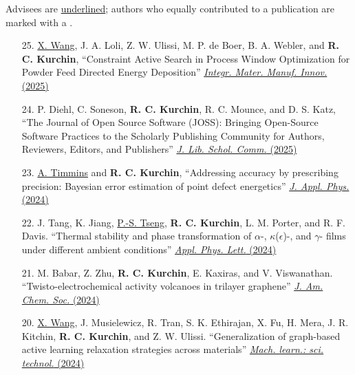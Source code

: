 Advisees are \uline{underlined}; authors who equally contributed to a publication are marked with a \textdagger.

\newcommand{\myname}{\textbf{R. C. Kurchin}}

\begin{enumerate}
        \item[25.] \uline{X. Wang}, J. A. Loli, Z. W. Ulissi, M. P. de Boer, B. A. Webler, and \myname, ``Constraint Active Search in Process Window Optimization for Powder Feed Directed Energy Deposition'' \href{https://doi.org/10.1007/s40192-025-00393-7}{\textit{Integr. Mater. Manuf. Innov.} (2025)}
        
        \item[24.] P. Diehl, C. Soneson, \myname, R. C. Mounce, and D. S. Katz, ``The Journal of Open Source Software (JOSS): Bringing Open-Source Software Practices to the Scholarly Publishing Community for Authors, Reviewers, Editors, and Publishers'' \href{https://doi.org/10.31274/jlsc.18285}{\textit{J. Lib. Schol. Comm.} (2025)}

        \item[23.] \uline{A. Timmins} and \myname, ``Addressing accuracy by prescribing precision: Bayesian error estimation of point defect energetics'' \href{https://doi.org/10.1063/5.0211543}{\textit{J. Appl. Phys.} (2024)}

        \item[22.] J. Tang, K. Jiang, \uline{P.-S. Tseng}, \myname, L. M. Porter, and R. F. Davis. ``Thermal stability and phase transformation of $\alpha$-, $\kappa$($\epsilon$)-, and $\gamma$- films under different ambient conditions'' \href{https://doi.org/10.1063/5.0214500}{\textit{Appl. Phys. Lett.} (2024)}

        \item[21.] M. Babar, Z. Zhu, \myname, E. Kaxiras, and V. Viswanathan. ``Twisto-electrochemical activity volcanoes in trilayer graphene'' \href{https://pubs.acs.org/doi/full/10.1021/jacs.4c03464}{\textit{J. Am. Chem. Soc.} (2024)}

        \item[20.] \uline{X. Wang}, J. Musielewicz, R. Tran, S. K. Ethirajan, X. Fu, H. Mera, J. R. Kitchin, \myname, and Z. W. Ulissi. ``Generalization of graph-based active learning relaxation strategies across materials'' \href{https://iopscience.iop.org/article/10.1088/2632-2153/ad37f0}{\textit{Mach. learn.: sci. technol.} (2024)}


\end{enumerate}
